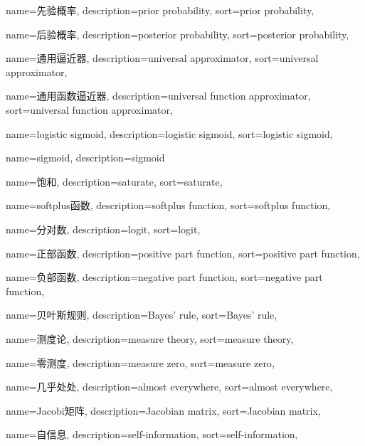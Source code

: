 {
  name=先验概率,
  description={prior probability},
  sort={prior probability},
}

{
  name=后验概率,
  description={posterior probability},
  sort={posterior probability},
}

{
  name=通用逼近器,
  description={universal approximator},
  sort={universal approximator},
}

{
  name=通用函数逼近器,
  description={universal function approximator},
  sort={universal function approximator},
}

{
  name=logistic sigmoid,
  description={logistic sigmoid},
  sort={logistic sigmoid},
}

{
  name=sigmoid,
  description={sigmoid}
}

{
  name=饱和,
  description={saturate},
  sort={saturate},
}

{
  name=softplus函数,
  description={softplus function},
  sort={softplus function},
}

{
  name=分对数,
  description={logit},
  sort={logit},
}

{
  name=正部函数,
  description={positive part function},
  sort={positive part function},
}

{
  name=负部函数,
  description={negative part function},
  sort={negative part function},
}

{
  name=贝叶斯规则,
  description={Bayes' rule},
  sort={Bayes' rule},
}

{
  name=测度论,
  description={measure theory},
  sort={measure theory},
}

{
  name=零测度,
  description={measure zero},
  sort={measure zero},
}

{
  name=几乎处处,
  description={almost everywhere},
  sort={almost everywhere},
}

{
  name=Jacobi矩阵,
  description={Jacobian matrix},
  sort={Jacobian matrix},
}

{
  name=自信息,
  description={self-information},
  sort={self-information},
}

